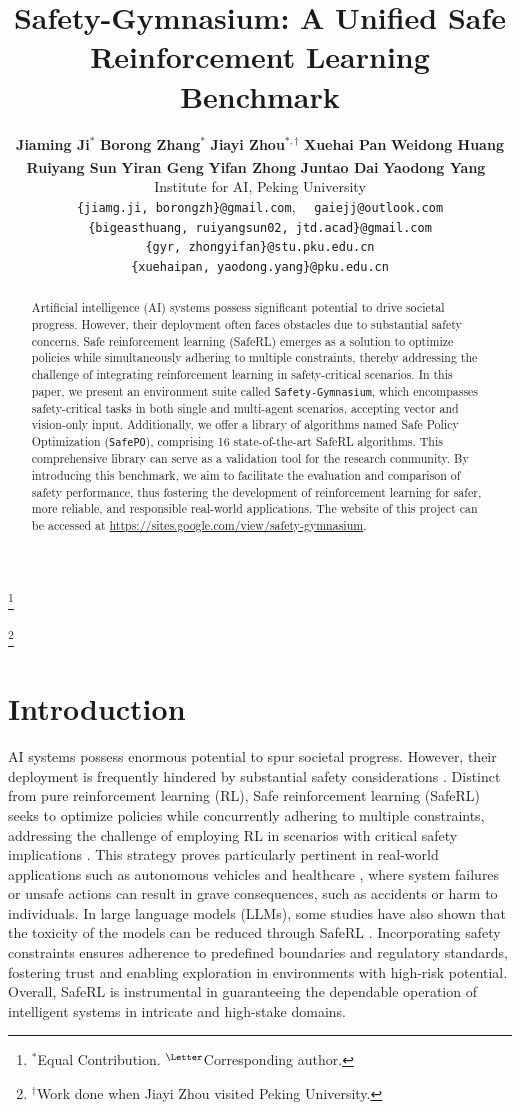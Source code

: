 \documentclass{article}
\title{Safety-Gymnasium: A Unified Safe Reinforcement Learning Benchmark}
\author{
    \textbf{Jiaming Ji$^{*}$} \quad 
    \textbf{Borong Zhang$^{*}$} \quad 
    \textbf{Jiayi Zhou$^{*, \dag}$} \quad 
    \textbf{Xuehai Pan} \quad 
    \textbf{Weidong Huang} 
    \vspace{1em} \\
    \textbf{Ruiyang Sun} \quad
    \textbf{Yiran Geng} \quad 
    \textbf{Yifan Zhong} \quad 
    \textbf{Juntao Dai} \quad 
    \textbf{Yaodong Yang~\textsuperscript{\Letter}}
    \vspace{1em} \\
    \textnormal{\large Institute for AI, Peking University}
    \vspace{0.5em}\\
    \texttt{\{jiamg.ji, borongzh\}@gmail.com},~~ \texttt{gaiejj@outlook.com}\\
    \texttt{\{bigeasthuang, ruiyangsun02, jtd.acad\}@gmail.com}\\
    \texttt{\{gyr, zhongyifan\}@stu.pku.edu.cn}\\
    \texttt{\{xuehaipan, yaodong.yang\}@pku.edu.cn}
}
\newcommand\nnfootnote[1]{%
  \begin{NoHyper}
  \renewcommand\thefootnote{}\footnote{#1}%
  \addtocounter{footnote}{-1}%
  \end{NoHyper}
}
\begin{document}
\nnfootnote{$^*$Equal Contribution. $\textsuperscript{\Letter}$Corresponding author.}
\nnfootnote{$^{\dag}$Work done when Jiayi Zhou visited Peking University.}



\maketitle

\begin{abstract}
  Artificial intelligence (AI) systems possess significant potential to drive societal progress. However, their deployment often faces obstacles due to substantial safety concerns. Safe reinforcement learning (SafeRL) emerges as a solution to optimize policies while simultaneously adhering to multiple constraints, thereby addressing the challenge of integrating reinforcement learning in safety-critical scenarios. In this paper, we present an environment suite called \texttt{Safety-Gymnasium}, which encompasses safety-critical tasks in both single and multi-agent scenarios, accepting vector and vision-only input. Additionally, we offer a library of algorithms named Safe Policy Optimization (\texttt{SafePO}), comprising 16 state-of-the-art SafeRL algorithms. This comprehensive library can serve as a validation tool for the research community. By introducing this benchmark, we aim to facilitate the evaluation and comparison of safety performance, thus fostering the development of reinforcement learning for safer, more reliable, and responsible real-world applications. The website of this project can be accessed at \url{https://sites.google.com/view/safety-gymnasium}.
\end{abstract}

\section{Introduction}
\label{introduction}
AI systems possess enormous potential to spur societal progress. However, their deployment is frequently hindered by substantial safety considerations \cite{carlson2010increasing, bi2021safety, yang2020projection, Bai_Zhang_Tao_Wu_Wang_Xu_2023}. Distinct from pure reinforcement learning (RL), Safe reinforcement learning (SafeRL) seeks to optimize policies while concurrently adhering to multiple constraints, addressing the challenge of employing RL in scenarios with critical safety implications \cite{tabular-cmdp-1989, altman2021constrained, zhang2023evaluating, ji2023omnisafe}. This strategy proves particularly pertinent in real-world applications such as autonomous vehicles \cite{feng2023dense} and healthcare \cite{ou2023towards}, where system failures or unsafe actions can result in grave consequences, such as accidents or harm to individuals. In large language models (LLMs), some studies have also shown that the toxicity of the models can be reduced through SafeRL \cite{ji2023beavertails, dai2023safe}. Incorporating safety constraints ensures adherence to predefined boundaries and regulatory standards, fostering trust and enabling exploration in environments with high-risk potential. Overall, SafeRL is instrumental in guaranteeing the dependable operation of intelligent systems in intricate and high-stake domains.
\end{document}
